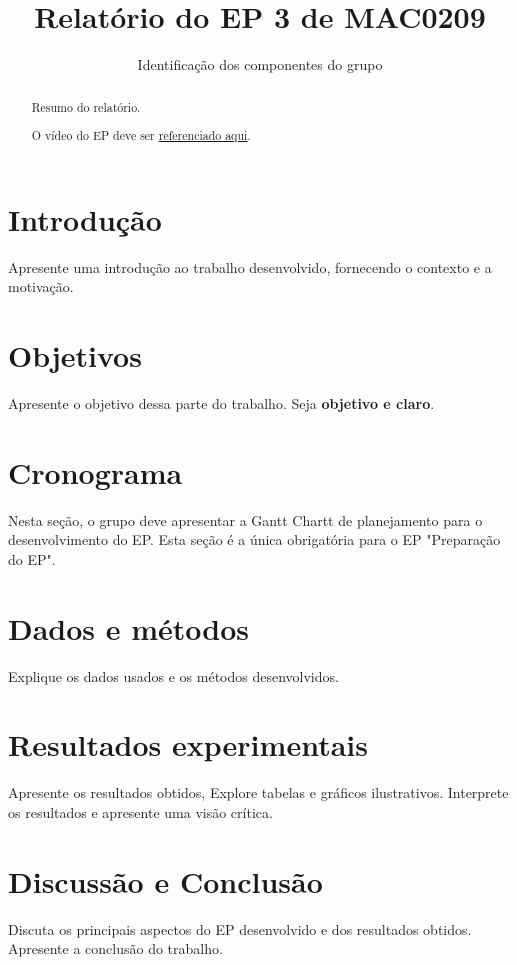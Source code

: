 \documentclass{article}
\title{Relatório do EP 3 de MAC0209}
\author{Identificação dos componentes do grupo}
\begin{document}
\maketitle


\begin{abstract}
Resumo do relatório.

O vídeo do EP deve ser \href{YOUTUBE}{referenciado aqui}.

\end{abstract}

\newpage

\tableofcontents

\newpage

\section{Introdução}

Apresente uma introdução ao trabalho desenvolvido, fornecendo o contexto e a motivação.

\section{Objetivos}

Apresente o objetivo dessa parte do trabalho. Seja {\bf objetivo e claro}.

\section{Cronograma}

Nesta seção, o grupo deve apresentar a Gantt Chartt de planejamento para o desenvolvimento do EP. Esta seção é a única obrigatória para o EP "Preparação do EP".

\section{Dados e métodos}

Explique os dados usados e os métodos desenvolvidos.

\section{Resultados experimentais}

Apresente os resultados obtidos, Explore tabelas e gráficos ilustrativos. Interprete os resultados e apresente uma visão crítica.

\section{Discussão e Conclusão}

Discuta os principais aspectos do EP desenvolvido e dos resultados obtidos. Apresente a conclusão do trabalho.
\end{document}
